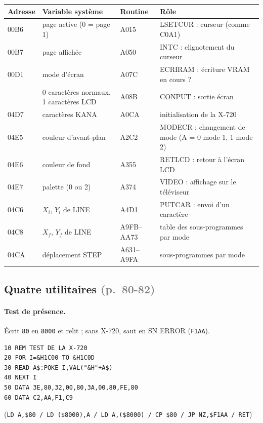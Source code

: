 \documentclass[a4paper,10pt]{article}
\newcommand{\hex}[1]{\texttt{#1}}
\newcommand{\pg}[1]{\texorpdfstring{\textcolor{gray}{\small(p.~#1)}}{}}
\begin{document}
\begin{center}\small
\begin{tabular}{@{}>{\ttfamily}l>{\raggedright}p{4.6cm}|>{\ttfamily}l>{\raggedright\arraybackslash}p{6.2cm}@{}}
\toprule
\normalfont Adresse & Variable système & \normalfont Routine & Rôle \\
\midrule
00B6 & page active (0 = page 1) & A015 & LSETCUR : curseur (comme C0A1) \\
00B7 & page affichée & A050 & INTC : clignotement du curseur \\
00D1 & mode d'écran & A07C & ECRIRAM : écriture VRAM en cours ? \\
0015 & 0 caractères normaux, 1 caractères LCD & A08B & CONPUT : sortie écran \\
04D7 & caractères KANA & A0CA & initialisation de la X-720 \\
04E5 & couleur d'avant-plan & A2C2 & MODECR : changement de mode (A = 0 mode 1, 1 mode 2) \\
04E6 & couleur de fond & A355 & RETLCD : retour à l'écran LCD \\
04E7 & palette (0 ou 2) & A374 & VIDEO : affichage sur le téléviseur \\
04C6 & $X_i$, $Y_i$ de LINE & A4D1 & PUTCAR : envoi d'un caractère \\
04C8 & $X_f$, $Y_f$ de LINE & A9FB--AA73 & table des sous-programmes par mode \\
04CA & déplacement STEP & A631--A9FA & sous-programmes par mode \\
\bottomrule
\end{tabular}
\end{center}

\subsection{Quatre utilitaires \pg{80-82}}

\paragraph{Test de présence.} Écrit \hex{80} en \hex{8000} et relit ; sans
X-720, saut en SN ERROR (\hex{F1AA}).
\begin{verbatim}
10 REM TEST DE LA X-720
20 FOR I=&H1C00 TO &H1C0D
30 READ A$:POKE I,VAL("&H"+A$)
40 NEXT I
50 DATA 3E,80,32,00,80,3A,00,80,FE,80
60 DATA C2,AA,F1,C9
\end{verbatim}
(\texttt{LD A,\$80 / LD (\$8000),A / LD A,(\$8000) / CP \$80 / JP NZ,\$F1AA / RET})
\end{document}
